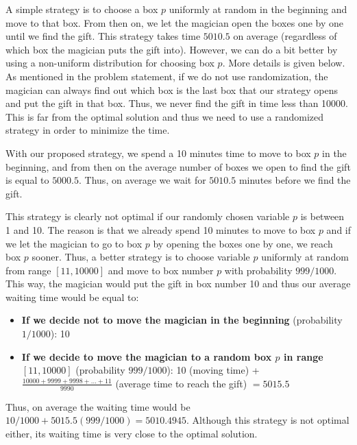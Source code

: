 \begin{solution}
A simple  strategy is to choose a box $p$ uniformly at random in the beginning and move to that box. From then on, we let the magician open the boxes one by one until we find the gift. This strategy takes time $5010.5$ on average (regardless of which box the magician puts the gift into). However, we can do a bit better by using a non-uniform distribution for choosing box $p$. More details is given below.\\[0.2cm]

As mentioned in the problem statement, if we do not use randomization, the magician can always find out which box is the last box that our strategy opens and put the gift in that box. Thus, we never find the gift in time less than 10000. This is far from the optimal solution and thus we need to use a randomized strategy in order to minimize the time.

With our proposed strategy, we spend a 10 minutes time to move to box $p$ in the beginning, and from then on the average number of boxes we open to find the gift is equal to $5000.5$. Thus, on average we wait for $5010.5$ minutes before we find the gift.

This strategy is clearly not optimal  if our randomly chosen variable $p$ is between 1 and 10. The reason is that we already spend 10 minutes to move to box $p$ and if we let the magician to go to box $p$ by opening the boxes one by one, we reach box $p$ sooner. Thus, a better strategy is to choose variable $p$ uniformly at random from range $[11, 10000]$ and move to box number $p$ with probability $999/1000$. This way, the magician would put the gift in box number 10 and thus our average waiting time would be equal to:
\begin{itemize}
	\item \textbf{If we decide not to move the magician in the beginning} (probability $1/1000$): 10  
	\item \textbf{If we decide to move the magician to a random box $p$ in range $[11, 10000]$} (probability $999/1000$): 10 (moving time) + $\frac{10000 + 9999 + 9998 + \ldots + 11}{9990}$ (average time to reach the gift) $ = 5015.5$ 
\end{itemize} 
Thus, on average the waiting time would be $10 / 1000 + 5015.5 (999/1000) = 5010.4945$. Although this strategy is not optimal either, its waiting time is very close to the optimal solution.
\end{solution}
